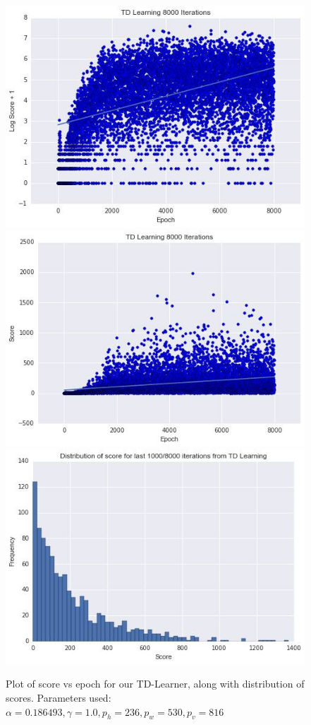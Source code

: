 \documentclass[letterpaper]{article}
\begin{document}
\begin{figure}
\centering
\includegraphics[scale=0.5]{td_8000_log}
\includegraphics[scale=0.5]{TD_8000_score}
\includegraphics[scale=0.5]{td_8000_distribution}
\caption{Plot of score vs epoch for our TD-Learner, along with distribution of scores. Parameters used: $\alpha = 0.186493, \gamma = 1.0, p_h = 236, p_w = 530,p_v = 816$}
\label{fig:tdscore}
\end{figure}
\end{document}
